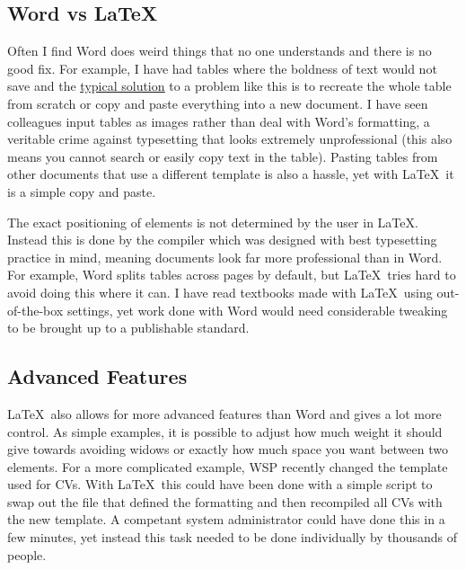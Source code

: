 \subsection{Word vs \LaTeX}
\label{subsec:WordVsLatex}

Often I find Word does weird things that no one understands and there is no good fix. For example, I have had tables where the boldness of text would not save and the \href{https://learn.microsoft.com/en-us/answers/questions/5092571/tables-in-ms-word-are-changing-when-saved-and-re-o}{\underline{typical solution}} to a problem like this is to recreate the whole table from scratch or copy and paste everything into a new document. I have seen colleagues input tables as images rather than deal with Word's formatting, a veritable crime against typesetting that looks extremely unprofessional (this also means you cannot search or easily copy text in the table). Pasting tables from other documents that use a different template is also a hassle, yet with \LaTeX\ it is a simple copy and paste.

The exact positioning of elements is not determined by the user in \LaTeX. Instead this is done by the compiler which was designed with best typesetting practice in mind, meaning documents look far more professional than in Word. For example, Word splits tables across pages by default, but \LaTeX\ tries hard to avoid doing this where it can. I have read textbooks made with \LaTeX\ using out-of-the-box settings, yet work done with Word would need considerable tweaking to be brought up to a publishable standard.

\subsection{Advanced Features}
\label{subsec:AdvancedFeatures}

\LaTeX\ also allows for more advanced features than Word and gives a lot more control. As simple examples, it is possible to adjust how much weight it should give towards avoiding widows or exactly how much space you want between two elements. For a more complicated example, WSP recently changed the template used for CVs. With \LaTeX\ this could have been done with a simple script to swap out the file that defined the formatting and then recompiled all CVs with the new template. A competant system administrator could have done this in a few minutes, yet instead this task needed to be done individually by thousands of people.
